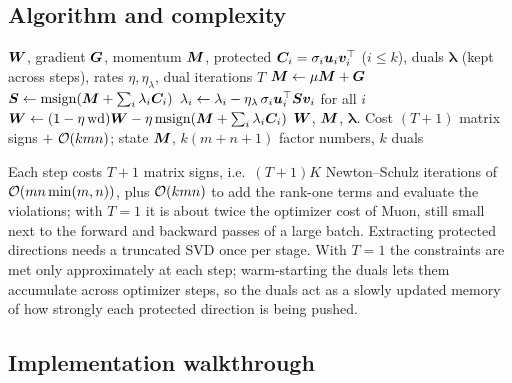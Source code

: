 \subsection{Algorithm and complexity}\label{sec:c11-mo-alg}

\begin{algorithm}[t]
\caption{One Muon-OGD step for a weight matrix (rank-one constraints, warm-started duals).}\label{alg:c11-muonogd}
\begin{algorithmic}[1]
\Require $\bm{W}$, gradient $\bm{G}$, momentum $\bm{M}$, protected $\bm{C}_i = \sigma_i\bm{u}_i\bm{v}_i^{\top}$ ($i\le k$),
duals $\bm{\lambda}$ (kept across steps), rates $\eta, \eta_\lambda$, dual iterations $T$
\State $\bm{M} \gets \mu\bm{M} + \bm{G}$ 
  \State $\bm{S} \gets \operatorname{msign}(\bm{M} + \sum_i\lambda_i\bm{C}_i)$ 
  \State $\lambda_i \gets \lambda_i - \eta_\lambda\,\sigma_i\bm{u}_i^{\top}\bm{S}\bm{v}_i$ for all $i$ 
\EndFor
\State $\bm{W} \gets (1 - \eta\,\mathrm{wd})\bm{W} - \eta\operatorname{msign}(\bm{M} + \sum_i\lambda_i\bm{C}_i)$
\Ensure $\bm{W}$, $\bm{M}$, $\bm{\lambda}$. Cost $(T+1)$ matrix signs $+\ \mathcal{O}(kmn)$; state $\bm{M}$, $k(m+n+1)$ factor numbers, $k$ duals
\end{algorithmic}
\end{algorithm}

Each step costs $T+1$ matrix signs, i.e.\ $(T+1)K$ Newton--Schulz iterations of
$\mathcal{O}(mn\min(m,n))$, plus $\mathcal{O}(kmn)$ to add the rank-one terms and evaluate the violations;
with $T = 1$ it is about twice the optimizer cost of Muon, still small next to the forward and
backward passes of a large batch. Extracting protected directions needs a truncated SVD once per
stage. With $T = 1$ the constraints are met only approximately at each step; warm-starting the
duals lets them accumulate across optimizer steps, so the duals act as a slowly updated memory of
how strongly each protected direction is being pushed.

\subsection{Implementation walkthrough}\label{sec:c11-mo-code}

